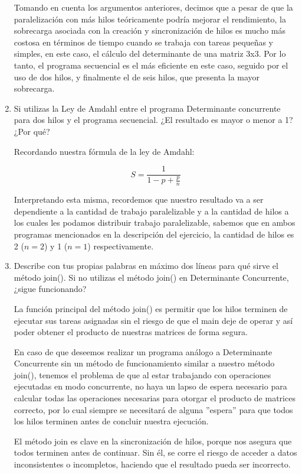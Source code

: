 \begin{enumerate}
Tomando en cuenta los argumentos anteriores, decimos que a pesar de que la paralelización con más hilos teóricamente podría mejorar el rendimiento, la sobrecarga asociada con la creación y sincronización de hilos es mucho más costosa en términos de tiempo cuando se trabaja con tareas pequeñas y simples, en este caso, el cálculo del determinante de una matriz 3x3. Por lo tanto, el programa secuencial es el más eficiente en este caso, seguido por el uso de dos hilos, y finalmente el de seis hilos, que presenta la mayor sobrecarga.


    \hfill    
    
    \item Si utilizas la Ley de Amdahl entre el programa Determinante concurrente para dos hilos y el programa secuencial. ¿El resultado es mayor o menor a 1? ¿Por qué?

    Recordando nuestra fórmula de la ley de Amdahl:

    \[ S = \frac{1}{1-p + \frac{p}{n}}\]

    Interpretando esta misma, recordemos que nuestro resultado va a ser dependiente a la cantidad de trabajo paralelizable y a la cantidad de hilos a los cuales les podamos distribuir trabajo paralelizable, sabemos que en ambos programas mencionados en la descripción del ejercicio, la cantidad de hilos es 2 ($n=2$) y 1 ($n=1$) respectivamente.

    \hfill    
    
    \item Describe con tus propias palabras en máximo dos líneas para qué sirve el método join(). Si no utilizas el método join() en Determinante Concurrente, ¿sigue funcionando?

    La función principal del método join() es permitir que los hilos terminen de ejecutar sus tareas asignadas sin el riesgo de que el main deje de operar y así poder obtener el producto de nuestras matrices de forma segura.
    
    En caso de que deseemos realizar un programa análogo a Determinante Concurrente sin un método de funcionamiento similar a nuestro método join(), tenemos el problema de que al estar trabajando con operaciones ejecutadas en modo concurrente, no haya un lapso de espera necesario para calcular todas las operaciones necesarias para otorgar el producto de matrices correcto, por lo cual siempre se necesitará de alguna ''espera'' para que todos los hilos terminen antes de concluir nuestra ejecución.

    El método join es clave en la sincronización de hilos, porque nos asegura que todos terminen antes de continuar. Sin él, se corre el riesgo de acceder a datos inconsistentes o incompletos, haciendo que el resultado pueda ser incorrecto.
    \hfill
    
\end{enumerate}
